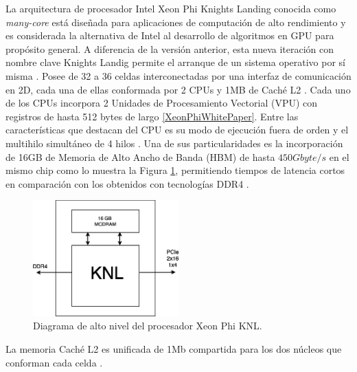 La arquitectura de procesador Intel Xeon Phi Knights Landing conocida como \textit{many-core} est\'a dise\~nada para aplicaciones de computaci\'on de alto rendimiento y es considerada la alternativa de Intel al desarrollo de algoritmos en GPU para prop\'osito general. A diferencia de la versi\'on anterior, esta nueva iteraci\'on con nombre clave Knights Landig permite el arranque de un sistema operativo por s\'i misma \cite{XeonPhiWhitePaper}. Posee de 32 a 36 celdas interconectadas por una interfaz de comunicaci\'on en 2D, cada una de ellas conformada por 2 CPUs y 1MB de Cach\'e L2 \cite{XeonPhiWhitePaper}. Cada uno de los CPUs incorpora 2 Unidades de Procesamiento Vectorial (VPU) con registros de hasta 512 bytes de largo \ref{XeonPhiWhitePaper}. 
Entre las caracter\'isticas que destacan del CPU es su modo de ejecuci\'on fuera de orden y el multihilo simult\'aneo de 4 hilos \cite{XeonPhiWhitePaper}. Una de sus particularidades es la incorporaci\'on de 16GB de Memoria de Alto Ancho de Banda (HBM) de hasta $450 Gbyte/s$ en el mismo chip como lo muestra la Figura \ref{fig:cpu_phi}, permitiendo tiempos de latencia cortos en comparaci\'on con los obtenidos con tecnolog\'ias DDR4 \cite{XeonPhiWhitePaper}.

\begin{figure}[H]
\centering
\includegraphics[width=0.5\textwidth]{fig/cpu}
\caption{Diagrama de alto nivel del procesador Xeon Phi KNL.}
\label{fig:cpu_phi}
\end{figure}


La memoria Cach\'e L2 es unificada de 1Mb compartida para los dos n\'ucleos que conforman cada celda \cite{XeonPhiWhitePaper}.
